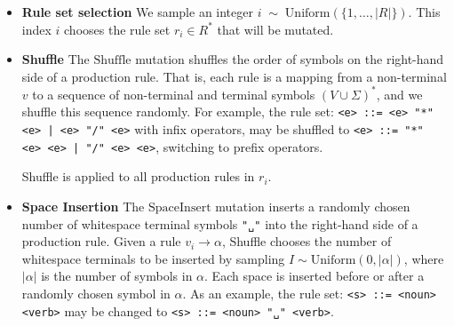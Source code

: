 \begin{itemize}

    \item \textbf{Rule set selection} 
    We sample an integer $i \;\sim\; \mathrm{Uniform}(\{1,\dots,|R|\})$. 
    This index $i$ chooses the rule set  $r_i \in R^*$ that will be mutated.

    \item \textbf{Shuffle} 
%
     The $\mathrm{Shuffle}$ mutation shuffles the order of symbols on the right-hand side of a production rule. 
     That is, each rule is a mapping from a non-terminal $v$ to a sequence of non-terminal and terminal symbols $(V \cup \Sigma)^*$, and we shuffle this sequence randomly. For example, the rule set:
    \verb+<e> ::= <e> "*" <e> | <e> "/" <e>+ with infix operators, may be shuffled to 
    \verb+<e> ::= "*" <e> <e> | "/" <e> <e>+, switching to prefix operators.
    
    Shuffle is applied to all production rules in $r_i$.
     
    


    
    \item \textbf{Space Insertion}
    The $\mathrm{SpaceInsert}$ mutation inserts a randomly chosen number of whitespace terminal symbols \verb+"␣"+ into the right-hand side of a production rule. Given a rule $v_i \rightarrow \alpha$, Shuffle chooses the number of whitespace terminals to be inserted by sampling $I \sim \textrm{Uniform}(0,|\alpha|)$, where $|\alpha|$ is the number of symbols in $\alpha$. Each space is inserted before or after a randomly chosen symbol in $\alpha$.
    As an example, the rule set:
    \verb+<s> ::= <noun> <verb>+ may be changed to 
    \verb+<s> ::= <noun> "␣" <verb>+.


\end{itemize}
